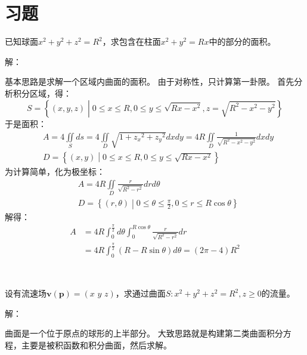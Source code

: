 \section{习题}

\begin{exercise}
已知球面$x^2+y^2+z^2=R^2$，求包含在柱面$x^2+y^2=Rx$中的部分的面积。
\end{exercise}

解：

基本思路是求解一个区域内曲面的面积。
由于对称性，只计算第一卦限。
首先分析积分区域，得：
\[
S=\left\{ \left( x,y,z \right) \middle| 0\leqslant x\leqslant R,0\leqslant y\leqslant \sqrt{Rx-x^2},z=\sqrt{R^2-x^2-y^2} \right\}
\]
于是面积：
\begin{align*}
&A=4\iint\limits_S{ds}=4\iint\limits_D{\sqrt{1+{z_x}^2+{z_y}^2}dxdy}=4R\iint\limits_D{\frac{1}{\sqrt{R^2-x^2-y^2}}dxdy} \\
&D=\left\{ \left( x,y \right) \middle| 0\leqslant x\leqslant R,0\leqslant y\leqslant \sqrt{Rx-x^2} \right\}
\end{align*}
为计算简单，化为极坐标：
\begin{align*}
&A=4R\iint\limits_D{\frac{r}{\sqrt{R^2-r^2}}drd\theta} \\
&D=\left\{ \left( r,\theta \right) \middle| 0\leqslant \theta \leqslant \frac{\pi}{2},0\leqslant r\leqslant R\cos \theta \right\}
\end{align*}
解得：
\begin{align*}
A&=4R\int_0^{\frac{\pi}{2}}{d\theta \int_0^{R\cos \theta}{\frac{r}{\sqrt{R^2-r^2}}dr}} \\
&=4R\int_0^{\frac{\pi}{2}}{\left( R-R\sin \theta \right) d\theta}=\left( 2\pi -4 \right) R^2
\end{align*}


~

\begin{exercise}
设有流速场$\boldsymbol{v}\left( \boldsymbol{p} \right) =\left( x\,\,y\,\,z \right) $，求通过曲面$S:x^2+y^2+z^2=R^2,z\geqslant 0$的流量。
\end{exercise}

解：

曲面是一个位于原点的球形的上半部分。
大致思路就是构建第二类曲面积分方程，主要是被积函数和积分曲面，然后求解。

